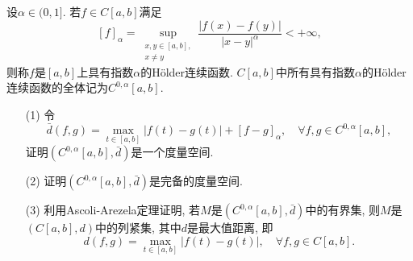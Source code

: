 \documentclass[UTF8,oneside,12pt]{article}  %
\theoremstyle{DingLi1}
\numberwithin{equation}{section}
\newtheorem{definition}{\hskip 2em 定义}[section]
\theoremstyle{DingLi2}
\newtheorem{example}{\hskip 2em 问题}[section]
\begin{document}
\begin{example}
\begin{definition}[H\"{o}lder连续函数]设$\alpha\in (0,1]$. 若$f\in C[a,b]$满足
$$[f]_\alpha=\sup_{\substack{x,y\in[a,b],\\ x\neq y}}\frac{|f(x)-f(y)|}{|x-y|^\alpha}<+\infty,$$
则称$f$是$[a,b]$上具有指数$\alpha$的H\"{o}lder连续函数. $C[a,b]$中所有具有指数$\alpha$的H\"{o}lder连续函数的全体记为$C^{0,\alpha}[a,b]$.
\end{definition}
\begin{itemize}
  \item[(1)]令
    $$\bar{d}(f,g)=\max_{t\in [a,b]}|f(t)-g(t)|+[f-g]_{\alpha}, \quad\forall f,g\in C^{0,\alpha}[a,b], $$
    证明$(C^{0,\alpha}[a,b],\bar{d})$是一个度量空间.
  \item[(2)] 证明$(C^{0,\alpha}[a,b],\bar{d})$是完备的度量空间.
  \item[(3)] 利用Ascoli-Arezela定理证明, 若$M$是$(C^{0,\alpha}[a,b],\bar{d})$中的有界集, 则$M$是$(C[a,b],d)$中的列紧集, 其中$d$是最大值距离, 即
    $$d(f,g)=\max_{t\in [a,b]}|f(t)-g(t)|,\quad \forall f,g\in C[a,b].$$
\end{itemize}
\end{example}
\end{document}
